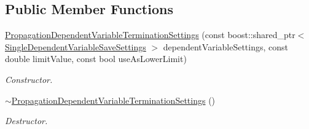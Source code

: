 \subsection*{Public Member Functions}
\begin{DoxyCompactItemize}
\item 
\hyperlink{classtudat_1_1propagators_1_1PropagationDependentVariableTerminationSettings_a2870934fd3a86e18b10a012d829e54a1}{Propagation\+Dependent\+Variable\+Termination\+Settings} (const boost\+::shared\+\_\+ptr$<$ \hyperlink{classtudat_1_1propagators_1_1SingleDependentVariableSaveSettings}{Single\+Dependent\+Variable\+Save\+Settings} $>$ dependent\+Variable\+Settings, const double limit\+Value, const bool use\+As\+Lower\+Limit)
\begin{DoxyCompactList}\small\item\em Constructor. \end{DoxyCompactList}\item 
\hyperlink{classtudat_1_1propagators_1_1PropagationDependentVariableTerminationSettings_afe286f4a746984bb130683954da31d5b}{$\sim$\+Propagation\+Dependent\+Variable\+Termination\+Settings} ()\hypertarget{classtudat_1_1propagators_1_1PropagationDependentVariableTerminationSettings_afe286f4a746984bb130683954da31d5b}{}\label{classtudat_1_1propagators_1_1PropagationDependentVariableTerminationSettings_afe286f4a746984bb130683954da31d5b}

\begin{DoxyCompactList}\small\item\em Destructor. \end{DoxyCompactList}\end{DoxyCompactItemize}
